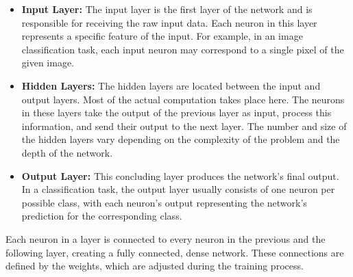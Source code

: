 \documentclass[12pt,fleqn,a4paper]{article}
\begin{document}
\begin{itemize}
     \item \textbf{Input Layer:} The input layer is the first layer of the network and is responsible for receiving the raw input data. Each neuron in this layer represents a specific feature of the input. For example, in an image classification task, each input neuron may correspond to a single pixel of the given image.
     \item \textbf{Hidden Layers:} The hidden layers are located between the input and output layers. Most of the actual computation takes place here. The neurons in these layers take the output of the previous layer as input, process this information, and send their output to the next layer. The number and size of the hidden layers vary depending on the complexity of the problem and the depth of the network.
     \item \textbf{Output Layer:} This concluding layer produces the network's final output. In a classification task, the output layer usually consists of one neuron per possible class, with each neuron's output representing the network's prediction for the corresponding class.
\end{itemize}

Each neuron in a layer is connected to every neuron in the previous and the following layer, creating a fully connected, dense network. These connections are defined by the weights, which are adjusted during the training process.
\end{document}
